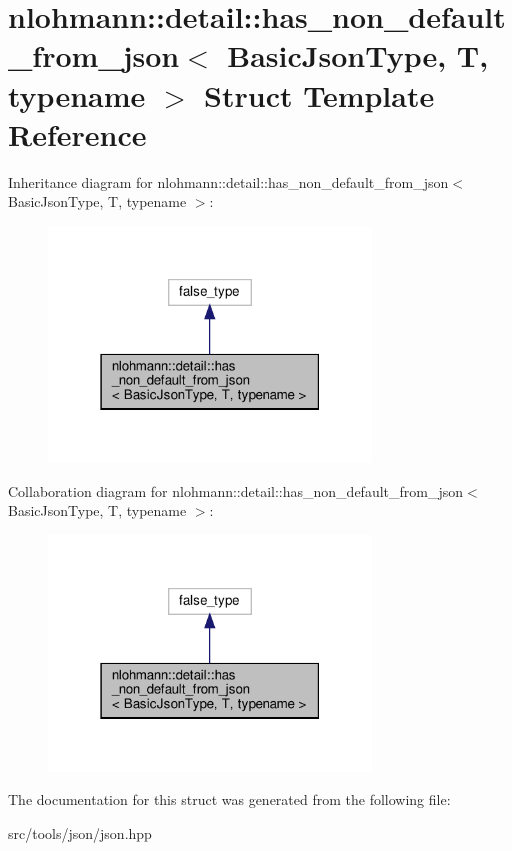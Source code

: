 \hypertarget{structnlohmann_1_1detail_1_1has__non__default__from__json}{}\section{nlohmann\+:\+:detail\+:\+:has\+\_\+non\+\_\+default\+\_\+from\+\_\+json$<$ Basic\+Json\+Type, T, typename $>$ Struct Template Reference}
\label{structnlohmann_1_1detail_1_1has__non__default__from__json}


Inheritance diagram for nlohmann\+:\+:detail\+:\+:has\+\_\+non\+\_\+default\+\_\+from\+\_\+json$<$ Basic\+Json\+Type, T, typename $>$\+:
\nopagebreak
\begin{figure}[H]
\begin{center}
\leavevmode
\includegraphics[width=243pt]{structnlohmann_1_1detail_1_1has__non__default__from__json__inherit__graph}
\end{center}
\end{figure}


Collaboration diagram for nlohmann\+:\+:detail\+:\+:has\+\_\+non\+\_\+default\+\_\+from\+\_\+json$<$ Basic\+Json\+Type, T, typename $>$\+:
\nopagebreak
\begin{figure}[H]
\begin{center}
\leavevmode
\includegraphics[width=243pt]{structnlohmann_1_1detail_1_1has__non__default__from__json__coll__graph}
\end{center}
\end{figure}


The documentation for this struct was generated from the following file\+:\begin{DoxyCompactItemize}
\item 
src/tools/json/json.\+hpp\end{DoxyCompactItemize}
